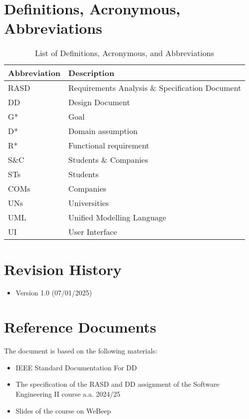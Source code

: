 \section{Definitions, Acronymous, Abbreviations}
\begin{table}[H]
\centering
\begin{tabular}{|l|l|}
\hline
\textbf{Abbreviation} & \textbf{Description} \\ \hline
RASD & Requirements Analysis \& Specification Document \\ \hline
DD & Design Document \\ \hline
G* & Goal \\ \hline
D* & Domain assumption \\ \hline
R* & Functional requirement \\ \hline
S\&C & Students \& Companies \\ \hline
STs & Students \\ \hline
COMs & Companies \\ \hline
UNs & Universities \\ \hline
UML & Unified Modelling Language \\ \hline
UI & User Interface \\ \hline
\end{tabular}
\caption{List of Definitions, Acronymous, and Abbreviations}
\label{table:abbreviations}
\end{table}

\section{Revision History}

\begin{itemize}
    \item Version 1.0 (07/01/2025)
\end{itemize}

\section{Reference Documents}

The document is based on the following materials:

\begin{itemize}
    \item IEEE Standard Documentation For DD
    \item The specification of the RASD and DD assignment of the Software Engineering II course a.a. 2024/25 
    \item Slides of the course on WeBeep
\end{itemize}

